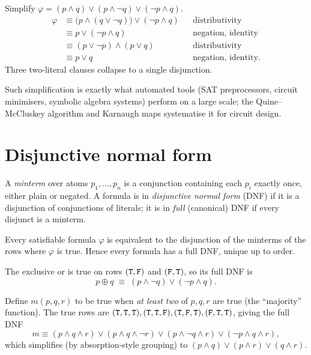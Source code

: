 \begin{example}
Simplify $\varphi = (p \wedge q) \vee (p \wedge \neg q) \vee (\neg p \wedge q)$.
\begin{align*}
\varphi &\equiv \bigl(p \wedge (q \vee \neg q)\bigr) \vee (\neg p \wedge q)
  && \text{distributivity}\\
&\equiv p \vee (\neg p \wedge q) && \text{negation, identity}\\
&\equiv (p \vee \neg p) \wedge (p \vee q) && \text{distributivity}\\
&\equiv p \vee q && \text{negation, identity.}
\end{align*}
Three two-literal clauses collapse to a single disjunction.
\end{example}

Such simplification is exactly what automated tools (SAT preprocessors,
circuit minimisers, symbolic algebra systems) perform on a large scale;
the Quine--McCluskey algorithm and Karnaugh maps systematise it for circuit
design.

\section{Disjunctive normal form}

\begin{definition}
A \emph{minterm} over atoms $p_1,\dots,p_n$ is a conjunction containing each
$p_i$ exactly once, either plain or negated. A formula is in \emph{disjunctive
normal form} (DNF) if it is a disjunction of conjunctions of literals; it is in
\emph{full} (canonical) DNF if every disjunct is a minterm.
\end{definition}

\begin{theorem}
Every satisfiable formula $\varphi$ is equivalent to the disjunction of the
minterms of the rows where $\varphi$ is true. Hence every formula has a full
DNF, unique up to order.
\end{theorem}

\begin{example}
The exclusive or is true on rows $(\mathtt{T},\mathtt{F})$ and $(\mathtt{F},\mathtt{T})$, so its full DNF
is
\[
p \oplus q \;\equiv\; (p \wedge \neg q) \vee (\neg p \wedge q).
\]
\end{example}

\begin{example}
Define $m(p,q,r)$ to be true when \emph{at least two} of $p,q,r$ are true
(the ``majority'' function). The true rows are
$(\mathtt{T},\mathtt{T},\mathtt{T}), (\mathtt{T},\mathtt{T},\mathtt{F}), (\mathtt{T},\mathtt{F},\mathtt{T}), (\mathtt{F},\mathtt{T},\mathtt{T})$, giving the full
DNF
\[
m \equiv (p\wedge q\wedge r) \vee (p\wedge q\wedge \neg r)
\vee (p\wedge \neg q\wedge r) \vee (\neg p\wedge q\wedge r),
\]
which simplifies (by absorption-style grouping) to
$(p \wedge q) \vee (p \wedge r) \vee (q \wedge r)$.
\end{example}

